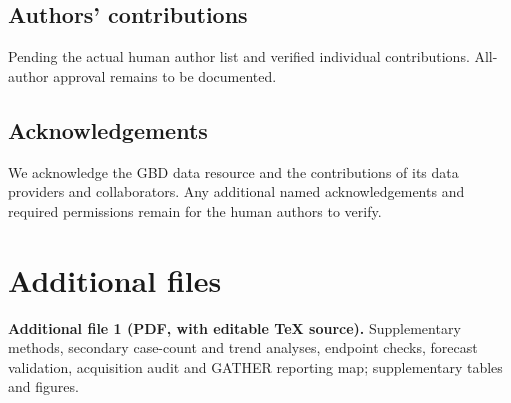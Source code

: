 \documentclass[11pt,a4paper]{article}
\begin{document}
\subsection*{Authors' contributions}
Pending the actual human author list and verified individual contributions. All-author approval remains to be documented.
\subsection*{Acknowledgements}
We acknowledge the GBD data resource and the contributions of its data providers and collaborators. Any additional named acknowledgements and required permissions remain for the human authors to verify.

\section*{Additional files}
\textbf{Additional file 1 (PDF, with editable TeX source).} Supplementary methods, secondary case-count and trend analyses, endpoint checks, forecast validation, acquisition audit and GATHER reporting map; supplementary tables and figures.
\end{document}
